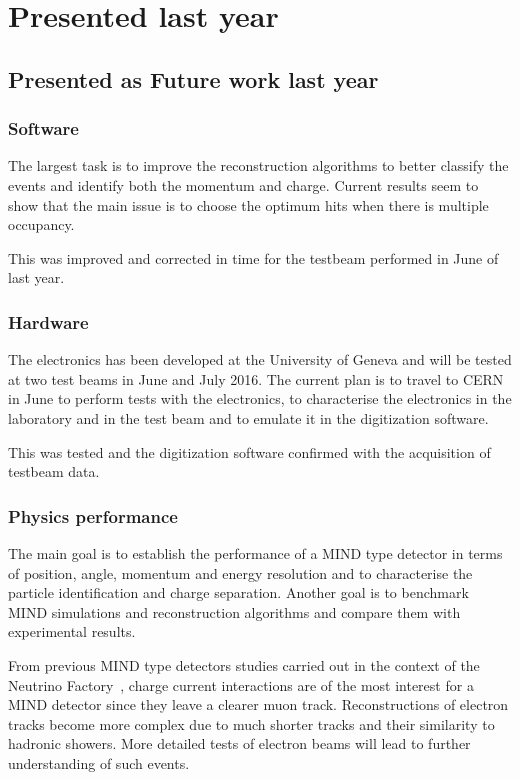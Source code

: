 \chapter{Presented last year}

\section{Presented as Future work last year}
\subsection{Software}
The largest task is to improve the reconstruction algorithms to better classify the events and identify both the momentum and charge. 
Current results seem to show that the main issue is to choose the optimum hits when there is multiple occupancy.

This was improved and corrected in time for the testbeam performed in June of last year.

\subsection{Hardware}
The electronics has been developed at the University of Geneva and will be tested at two test beams in June and July 2016. The current plan is to travel to CERN in June to perform tests with the electronics, to characterise the electronics in the laboratory and in the test beam and to emulate it in the digitization software.

This was tested and the digitization software confirmed with the acquisition of testbeam data.

\subsection{Physics performance}
The main goal is to establish the performance of a MIND type detector in terms of position, angle, momentum and energy resolution and to characterise the particle identification and charge separation. 
Another goal is to benchmark MIND simulations and reconstruction algorithms and compare them with experimental results.

From previous MIND type detectors studies carried out in the context of the Neutrino Factory~\cite{25NUfact}, charge current interactions are of the most interest for a MIND detector since they leave a clearer muon track. Reconstructions of electron tracks become more complex due to much shorter tracks and their similarity to hadronic showers. More detailed tests of electron beams will lead to further understanding of such events.

